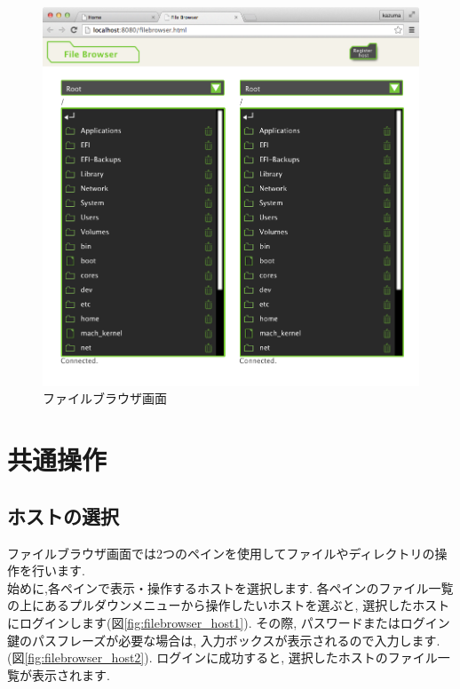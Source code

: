 \documentclass[a4paper,10pt,oneside]{jsbook}
\begin{document}
\begin{figure}[H]
	\begin{center}
		\includegraphics[width=12.0cm]{image/filebrowser_000.png}
	\end{center}
	\caption{ファイルブラウザ画面}
	\label{fig:filebrowser}
\end{figure}

\newpage



\section{共通操作}
\subsection{ホストの選択}
ファイルブラウザ画面では2つのペインを使用してファイルやディレクトリの操作を行います.\\
始めに,各ペインで表示・操作するホストを選択します.
各ペインのファイル一覧の上にあるプルダウンメニューから操作したいホストを選ぶと,
選択したホストにログインします(図\ref{fig:filebrowser_host1}).
その際, パスワードまたはログイン鍵のパスフレーズが必要な場合は, 入力ボックスが表示されるので入力します.(図\ref{fig:filebrowser_host2}).
ログインに成功すると, 選択したホストのファイル一覧が表示されます.
\end{document}
